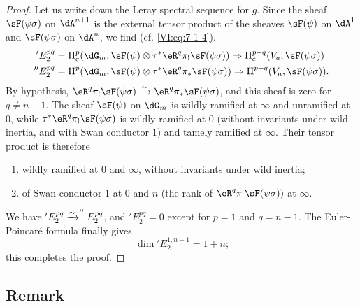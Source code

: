 \begin{proof}[Proof]
Let us write down the Leray spectral sequence for $g$. Since the sheaf $\sF(\psi\sigma)$ on 
$\dA^{n+1}$ is the external tensor product of the sheaves $\sF(\psi)$ on 
$\dA^1$ and $\sF(\psi\sigma)$ on $\dA^n$, we find (cf. \eqref{VI:eq:7-1-4}). 
\begin{align*}
  'E_2^{p q} &= \h_c^p(\dG_m,\sF(\psi)\otimes \tau^\ast \eR^q \pi_! \sF(\psi\sigma)) \Rightarrow \h_c^{p+q}(V_a,\sF(\psi\sigma)) \\
  ''E_2^{p q} &= \h^p(\dG_m,\sF(\psi)\otimes \tau^\ast \eR^q \pi_\ast \sF(\psi\sigma)) \Rightarrow \h^{p+q}(V_a,\sF(\psi\sigma)) \text{.} 
\end{align*}
By hypothesis, 
$\eR^q \pi_! \sF(\psi\sigma) \iso \eR^q \pi_\ast \sF(\psi\sigma)$, and this 
sheaf is zero for $q\ne n-1$. The sheaf $\sF(\psi)$ on $\dG_m$ is 
wildly ramified at $\infty$ and unramified at $0$, while 
$\tau^\ast \eR^q \pi_! \sF(\psi\sigma)$ is wildly ramified at $0$ (without 
invariants under wild inertia, and with Swan conductor $1$) and tamely 
ramified at $\infty$. Their tensor product is therefore 
\begin{enumerate}[\indent a)]
  \item wildly ramified at $0$ and $\infty$, without invariants under wild 
    inertia; 
  \item of Swan conductor $1$ at $0$ and $n$ (the rank of 
    $\eR^q \pi_! \sF(\psi\sigma))$ at $\infty$. 
\end{enumerate}
We have $'E_2^{p q} \xrightarrow\sim ''E_2^{p q}$, and $'E_2^{p q}=0$ except for $p=1$ and 
$q=n-1$. The Euler-Poincaré formula finally gives 
\[
  \dim{'E_2^{1,n-1}} = 1+n \text{;} 
\]
this completes the proof. 
\end{proof}





\subsection{Remark}\label{VI:7-15}

